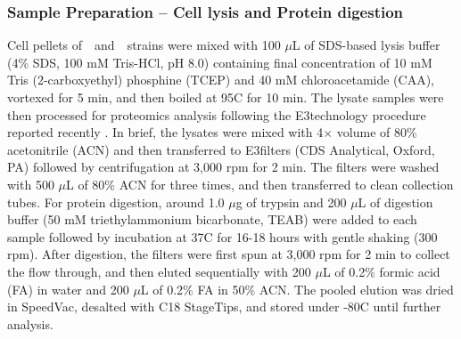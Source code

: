 \subsubsection{Sample Preparation -- Cell lysis and Protein digestion} %

Cell pellets of~\syn~and~\syna~strains were mixed with 100 $\mu$L of SDS-based lysis buffer (4\% SDS, 100 mM Tris-HCl, pH 8.0) containing final concentration of 10 mM Tris (2-carboxyethyl) phosphine (TCEP) and 40 mM chloroacetamide (CAA), vortexed for 5 min, and then boiled at 95\textdegree C for 10 min.
The lysate samples were then processed for proteomics analysis following the E3technology procedure reported recently \citep{martin_development_2024}.
In brief, the lysates were mixed with 4$\times$ volume of 80\% acetonitrile (ACN) and then transferred to E3filters (CDS Analytical, Oxford, PA) followed by centrifugation at 3,000 rpm for 2 min.
The filters were washed with 500 $\mu$L of 80\% ACN for three times, and then transferred to clean collection tubes.
For protein digestion, around 1.0 $\mu$g of trypsin and 200 $\mu$L of digestion buffer (50 mM triethylammonium bicarbonate, TEAB) were added to each sample followed by incubation at 37\textdegree C for 16-18 hours with gentle shaking (300 rpm).
After digestion, the filters were first spun at 3,000 rpm for 2 min to collect the flow through, and then eluted sequentially with 200 $\mu$L of 0.2\% formic acid (FA) in water and 200 $\mu$L of 0.2\% FA in 50\% ACN.
The pooled elution was dried in SpeedVac, desalted with C18 StageTips, and stored under -80\textdegree C until further analysis.

